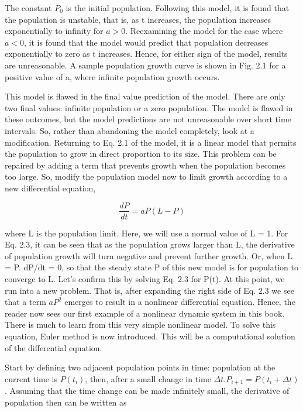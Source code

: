 \documentclass[12pt]{article}
\begin{document}
The constant $P_0$ is the initial population. Following this model, it is found that the
population is unstable, that is, as t increases, the population increases exponentially
to infinity for $a > 0$. Reexamining the model for the case where $a < 0$, it is found that
the model would predict that population decreases exponentially to zero as t
increases. Hence, for either sign of the model, results are unreasonable. A sample
population growth curve is shown in Fig. 2.1 for a positive value of a, where infinite
population growth occurs.

\hfill

This model is flawed in the final value prediction of the model. There are only
two final values: infinite population or a zero population. The model is flawed in
these outcomes, but the model predictions are not unreasonable over short time
intervals. So, rather than abandoning the model completely, look at a modification.
Returning to Eq. 2.1 of the model, it is a linear model that permits the population to
grow in direct proportion to its size. This problem can be repaired by adding a term
that prevents growth when the population becomes too large. So, modify the population
model now to limit growth according to a new differential equation,

\[
\frac{dP}{dt} = a P (L-P)
\]

where L is the population limit. Here, we will use a normal value of L = 1. For
Eq. 2.3, it can be seen that as the population grows larger than L, the derivative of
population growth will turn negative and prevent further growth. Or, when L = P. dP/dt = 0, so that the steady state P of this new model is for population to converge to
L. Let’s confirm this by solving Eq. 2.3 for P(t). At this point, we run into a new
problem. That is, after expanding the right side of Eq. 2.3 we see that a term $aP^2$ emerges to result in a nonlinear differential equation. Hence, the reader now sees
our first example of a nonlinear dynamic system in this book. There is much to learn
from this very simple nonlinear model. To solve this equation, Euler method is now
introduced. This will be a computational solution of the differential equation.

\hfill

Start by defining two adjacent population points in time: population at the current time is $P(t_i)$, then, after a small change in time $\Delta t. P_{i+1} = P(t_i + \Delta t)$. Assuming
that the time change can be made infinitely small, the derivative of population then
can be written as
\end{document}
